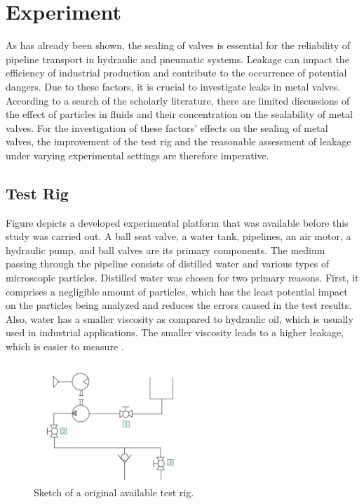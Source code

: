 \chapter{Experiment}
\label{ch:Experiment}
As has already been shown, the sealing of valves is essential for the reliability of 
pipeline transport in hydraulic and pneumatic systems. Leakage can impact the efficiency
 of industrial production and contribute to the occurrence of potential dangers. 
Due to these factors, it is crucial to investigate leaks in metal valves. According to a search 
of the scholarly literature, there are limited discussions of the effect of particles in fluids 
and their concentration on the sealability of metal valves. For the investigation of these 
factors' effects on the sealing of metal valves, the improvement of the test rig and the 
reasonable assessment of leakage under varying experimental settings are therefore imperative.

\section{Test Rig}
\label{Test Rig}
Figure  depicts a developed experimental platform that was available before this study 
was carried out. A ball seat valve, a water tank, pipelines, an air motor, a hydraulic pump,
and ball valves are its primary components. The medium passing through the pipeline 
consists of distilled water and various types of microscopic particles. Distilled water
was chosen for two primary reasons. First, it comprises a negligible amount of particles,
which has the least potential impact on the particles being analyzed and reduces the 
errors caused in the test results. Also, water has a smaller viscosity as compared to
hydraulic oil, which is usually used in industrial applications. 
The smaller viscosity leads to a higher leakage, which is easier to measure \cite{fischer2021influence}.\\

\begin{figure}[htbp]
    \centering
    \includegraphics[width=0.5\textwidth]{figures/TestRig/TestRig1.jpg}
    \caption{Sketch of a original available test rig.}
    \label{fig:TestRig1}
\end{figure}


